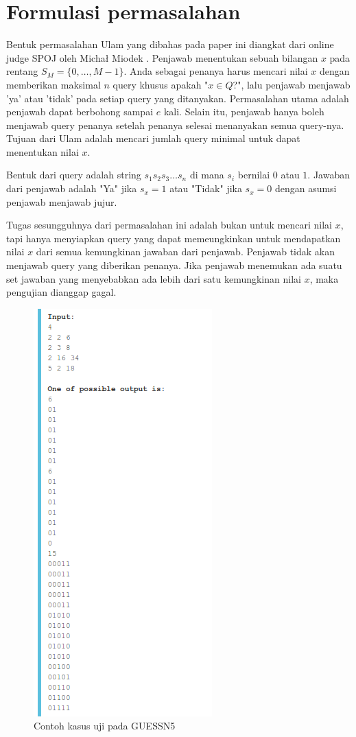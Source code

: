 \section{Formulasi permasalahan}

Bentuk permasalahan Ulam yang dibahas pada paper ini diangkat dari online judge SPOJ oleh Micha\l{} Miodek \cite{guessn5}. Penjawab menentukan sebuah bilangan $x$ pada rentang $S_M=\{0,\ldots,M-1\}$. Anda sebagai penanya harus mencari nilai $x$ dengan memberikan maksimal $n$ query khusus apakah "$x \in Q$?", lalu penjawab menjawab 'ya' atau 'tidak' pada setiap query yang ditanyakan. Permasalahan utama adalah penjawab dapat berbohong sampai $e$ kali. Selain itu, penjawab hanya boleh menjawab query penanya setelah penanya selesai menanyakan semua query-nya. Tujuan dari Ulam adalah mencari jumlah query minimal untuk dapat menentukan nilai $x$.

Bentuk dari query adalah string $s_1s_2s_3\ldots s_n$ di mana $s_i$ bernilai $0$ atau $1$. Jawaban dari penjawab adalah "Ya" jika $s_x=1$ atau "Tidak" jika $s_x=0$ dengan asumsi penjawab menjawab jujur.

Tugas sesungguhnya dari permasalahan ini adalah bukan untuk mencari nilai $x$, tapi hanya menyiapkan query yang dapat memeungkinkan untuk mendapatkan nilai $x$ dari semua kemungkinan jawaban dari penjawab. Penjawab tidak akan menjawab query yang diberikan penanya. Jika penjawab menemukan ada suatu set jawaban yang menyebabkan ada lebih dari satu kemungkinan nilai $x$, maka pengujian dianggap gagal.

\begin{figure}
\centering
\includegraphics[scale=0.43]{../img/example.png}
\caption{Contoh kasus uji pada GUESSN5}
\label{fig:guessn5_test_case}
\end{figure}

